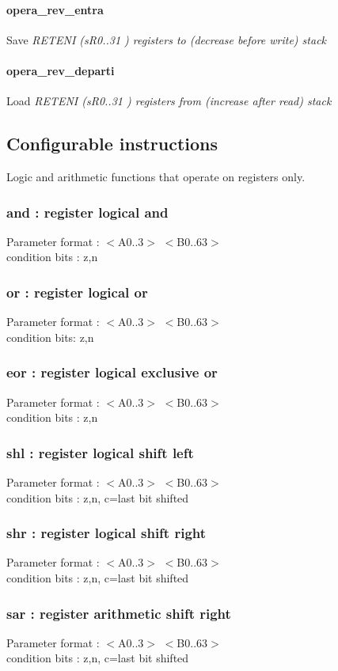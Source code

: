 \documentclass[a4paper,11pt]{article}
\begin{document}
\paragraph{opera\_rev\_entra}
  Save \sl RETENI \rm (\sl sR0..31 \rm) registers to (decrease before write) stack

\paragraph{opera\_rev\_departi}
  Load \sl RETENI \rm (\sl sR0..31 \rm) registers from (increase after read) stack

\subsection{Configurable instructions}
Logic and arithmetic functions that operate on registers only.

\subsubsection{and : register logical and} 
 Parameter format : $<$A0..3$>$ $<$B0..63$>$\\
 condition bits : z,n
\subsubsection{or : register logical or}  
 Parameter format : $<$A0..3$>$ $<$B0..63$>$\\
 condition bits: z,n
\subsubsection{eor : register logical exclusive or} 
 Parameter format : $<$A0..3$>$ $<$B0..63$>$\\
 condition bits : z,n
\subsubsection{shl : register logical shift left} 
 Parameter format : $<$A0..3$>$ $<$B0..63$>$\\
 condition bits : z,n, c=last bit shifted
\subsubsection{shr : register logical shift right} 
 Parameter format : $<$A0..3$>$ $<$B0..63$>$\\
 condition bits : z,n, c=last bit shifted
\subsubsection{sar : register arithmetic shift right} 
 Parameter format : $<$A0..3$>$ $<$B0..63$>$\\
 condition bits : z,n, c=last bit shifted
\end{document}
